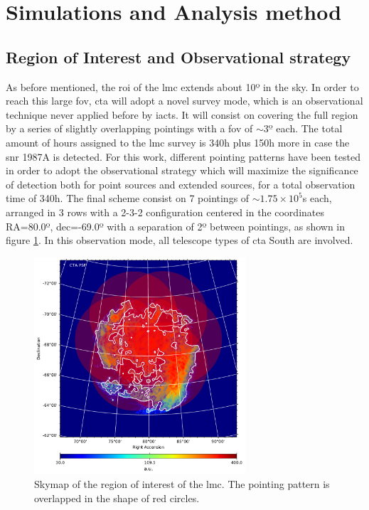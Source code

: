 \documentclass[main.tex]{subfiles}
\begin{document}
\section{Simulations and Analysis method} \label{sec:simana}

\subsection{Region of Interest and Observational strategy}

As before mentioned, the  \gls{roi} of the \gls{lmc} extends about 10º in the sky. In order to reach this large \gls{fov}, \gls{cta} will adopt a novel survey mode, which is an observational technique never applied before by \glspl{iact}. It will consist on covering the full region by a series of slightly overlapping pointings with a \gls{fov} of $\sim 3º$ each. The total amount of hours assigned to the \gls{lmc} survey is 340h plus 150h more in case the \gls{snr} 1987A is detected. For this work, different pointing patterns have been tested in order to adopt the observational strategy which will maximize the significance of detection both for point sources and extended sources, for a total observation time of 340h. The final scheme consist on 7 pointings of $\sim 1.75 \times 10^5$s each, arranged in 3 rows with a 2-3-2 configuration centered in the coordinates RA=80.0º, dec=-69.0º with a separation of 2º between pointings, as shown in figure \ref{fig:pointings}. In this observation mode, all telescope types of \gls{cta} South are involved.

\begin{figure}
  \centering
  \includegraphics[width=0.7\textwidth]{Pictures/lmc_hi_cdensity_flipped_plot_1000GeV_1TeV.pdf}
  \caption{\label{fig:pointings} Skymap of the region of interest of the \gls{lmc}. The pointing pattern is overlapped in the shape of red circles.}
\end{figure}
\end{document}
